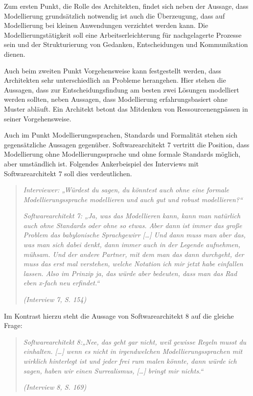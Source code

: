 Zum ersten Punkt, die Rolle des Architekten, findet sich neben der Aussage, dass Modellierung grundsätzlich notwendig ist auch die Überzeugung, dass auf Modellierung bei kleinen Anwendungen verzichtet werden kann. Die Modellierungstätigkeit soll eine Arbeitserleichterung für nachgelagerte Prozesse sein und der Strukturierung von Gedanken, Entscheidungen und Kommunikation dienen.

Auch beim zweiten Punkt Vorgehensweise kann festgestellt werden, dass Architekten sehr unterschiedlich an Probleme herangehen. Hier stehen die Aussagen, dass zur Entscheidungsfindung am besten zwei Lösungen modelliert werden sollten, neben Aussagen, dass Modellierung erfahrungsbasiert ohne Muster abläuft.  Ein Architekt betont das Mitdenken von Ressourcenengpässen in seiner Vorgehensweise. 

Auch im Punkt Modellierungssprachen, Standards und Formalität stehen sich gegensätzliche Aussagen gegenüber. Softwarearchitekt 7 vertritt die Position, dass Modellierung ohne Modellierungssprache und ohne formale Standards möglich, aber umständlich ist. Folgendes Ankerbeispiel des Interviews mit Softwarearchitekt 7 soll dies verdeutlichen.

\begin{quote}
\textit{Interviewer: „Würdest du sagen, du könntest auch ohne eine formale Modellierungssprache modellieren und auch gut und robust modellieren?“}

\textit{Softwarearchitekt 7: „Ja, was das Modellieren kann, kann man natürlich auch ohne Standards oder ohne so etwas. Aber dann ist immer das große Problem das babylonische Sprachgewirr […] Und dann muss man aber das, was man sich dabei denkt, dann immer auch in der Legende aufnehmen, mühsam. Und der andere Partner, mit dem man das dann durchgeht, der muss das erst mal verstehen, welche Notation ich mir jetzt habe einfallen lassen. Also im Prinzip ja, das würde aber bedeuten, dass man das Rad eben x-fach neu erfindet.“}

\hfill \textit{(Interview 7, S. 154)}
\end{quote}

Im Kontrast hierzu steht die Aussage von Softwarearchitekt 8 auf die gleiche Frage: 

 
 \begin{quote}

\textit{Softwarearchitekt 8:„Nee, das geht gar nicht, weil gewisse Regeln musst du einhalten. […] wenn es nicht in irgendwelchen Modellierungssprachen mit wirklich hinterlegt ist und jeder frei rum malen könnte, dann würde ich sagen, haben wir einen Surrealismus, […] bringt mir nichts.“}

\hfill \textit{(Interview 8, S. 169)}
\end{quote}

